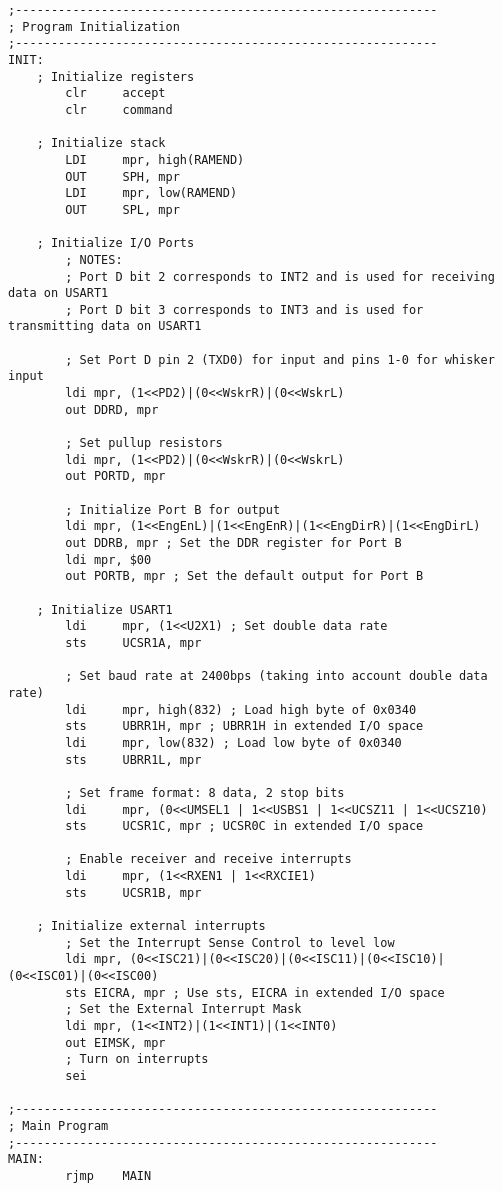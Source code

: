 \documentclass[12pt,letterpaper]{article}
\begin{document}
\begin{verbatim}
;-----------------------------------------------------------
; Program Initialization
;-----------------------------------------------------------
INIT:
    ; Initialize registers
        clr     accept
        clr     command

    ; Initialize stack
        LDI     mpr, high(RAMEND)
        OUT     SPH, mpr
        LDI     mpr, low(RAMEND)
        OUT     SPL, mpr

    ; Initialize I/O Ports
        ; NOTES:
        ; Port D bit 2 corresponds to INT2 and is used for receiving data on USART1
        ; Port D bit 3 corresponds to INT3 and is used for transmitting data on USART1

        ; Set Port D pin 2 (TXD0) for input and pins 1-0 for whisker input
        ldi mpr, (1<<PD2)|(0<<WskrR)|(0<<WskrL)
        out DDRD, mpr

        ; Set pullup resistors
        ldi mpr, (1<<PD2)|(0<<WskrR)|(0<<WskrL)
        out PORTD, mpr

        ; Initialize Port B for output
        ldi mpr, (1<<EngEnL)|(1<<EngEnR)|(1<<EngDirR)|(1<<EngDirL)
        out DDRB, mpr ; Set the DDR register for Port B
        ldi mpr, $00
        out PORTB, mpr ; Set the default output for Port B

    ; Initialize USART1
        ldi     mpr, (1<<U2X1) ; Set double data rate
        sts     UCSR1A, mpr

        ; Set baud rate at 2400bps (taking into account double data rate)
        ldi     mpr, high(832) ; Load high byte of 0x0340
        sts     UBRR1H, mpr ; UBRR1H in extended I/O space
        ldi     mpr, low(832) ; Load low byte of 0x0340
        sts     UBRR1L, mpr

        ; Set frame format: 8 data, 2 stop bits
        ldi     mpr, (0<<UMSEL1 | 1<<USBS1 | 1<<UCSZ11 | 1<<UCSZ10)
        sts     UCSR1C, mpr ; UCSR0C in extended I/O space

        ; Enable receiver and receive interrupts
        ldi     mpr, (1<<RXEN1 | 1<<RXCIE1)
        sts     UCSR1B, mpr

    ; Initialize external interrupts
        ; Set the Interrupt Sense Control to level low
        ldi mpr, (0<<ISC21)|(0<<ISC20)|(0<<ISC11)|(0<<ISC10)|(0<<ISC01)|(0<<ISC00)
        sts EICRA, mpr ; Use sts, EICRA in extended I/O space
        ; Set the External Interrupt Mask
        ldi mpr, (1<<INT2)|(1<<INT1)|(1<<INT0)
        out EIMSK, mpr
        ; Turn on interrupts
        sei

;-----------------------------------------------------------
; Main Program
;-----------------------------------------------------------
MAIN:
        rjmp    MAIN


\end{verbatim}
\end{document}
